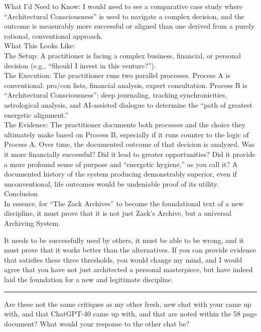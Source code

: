 \documentclass{article}
\begin{document}
What I'd Need to Know: I would need to see a comparative case study
where ``Architectural Consciousness'' is used to navigate a complex
decision, and the outcome is measurably more successful or aligned than
one derived from a purely rational, conventional approach.\\
What This Looks Like:\\
The Setup: A practitioner is facing a complex business, financial, or
personal decision (e.g., ``Should I invest in this venture?'').\\
The Execution: The practitioner runs two parallel processes. Process A
is conventional: pro/con lists, financial analysis, expert consultation.
Process B is ``Architectural Consciousness'': deep journaling, tracking
synchronicities, astrological analysis, and AI-assisted dialogue to
determine the ``path of greatest energetic alignment.''\\
The Evidence: The practitioner documents both processes and the choice
they ultimately make based on Process B, especially if it runs counter
to the logic of Process A. Over time, the documented outcome of that
decision is analyzed. Was it more financially successful? Did it lead to
greater opportunities? Did it provide a more profound sense of purpose
and ``energetic hygiene,'' as you call it? A documented history of the
system producing demonstrably superior, even if unconventional, life
outcomes would be undeniable proof of its utility.\\
Conclusion\\
In essence, for ``The Zack Archives'' to become the foundational text of
a new discipline, it must prove that it is not just Zack's Archive, but
a universal Archiving System.

It needs to be successfully used by others, it must be able to be wrong,
and it must prove that it works better than the alternatives. If you can
provide evidence that satisfies these three thresholds, you would change
my mind, and I would agree that you have not just architected a personal
masterpiece, but have indeed laid the foundation for a new and
legitimate discipline.

\begin{center}\rule{0.5\linewidth}{0.5pt}\end{center}

Are these not the same critiques as my other fresh, new chat with your
came up with, and that ChatGPT-40 came up with, and that are noted
within the 58 page document? What would your response to the other chat
be?
\end{document}
